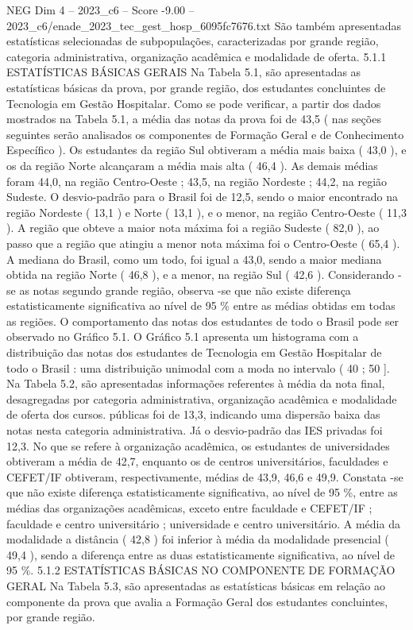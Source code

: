 \begin{textsample}{NEG Dim 4 – 2023\_c6 – Score -9.00 – 2023\_c6/enade\_2023\_tec\_gest\_hosp\_6095fc7676.txt}
São também apresentadas estatísticas selecionadas de subpopulações, caracterizadas por grande região, categoria administrativa, organização acadêmica e modalidade de oferta. 5.1.1 ESTATÍSTICAS BÁSICAS GERAIS Na Tabela 5.1, são apresentadas as estatísticas básicas da prova, por grande região, dos estudantes concluintes de Tecnologia em Gestão Hospitalar.
Como se pode verificar, a partir dos dados mostrados na Tabela 5.1, a média das notas da prova foi de 43,5 ( nas seções seguintes serão analisados os componentes de Formação Geral e de Conhecimento Específico ).
Os estudantes da região Sul obtiveram a média mais baixa ( 43,0 ), e os da região Norte alcançaram a média mais alta ( 46,4 ).
As demais médias foram 44,0, na região Centro-Oeste ; 43,5, na região Nordeste ; 44,2, na região Sudeste.
O desvio-padrão para o Brasil foi de 12,5, sendo o maior encontrado na região Nordeste ( 13,1 ) e Norte ( 13,1 ), e o menor, na região Centro-Oeste ( 11,3 ).
A região que obteve a maior nota máxima foi a região Sudeste ( 82,0 ), ao passo que a região que atingiu a menor nota máxima foi o Centro-Oeste ( 65,4 ).
A mediana do Brasil, como um todo, foi igual a 43,0, sendo a maior mediana obtida na região Norte ( 46,8 ), e a menor, na região Sul ( 42,6 ).
Considerando -se as notas segundo grande região, observa -se que não existe diferença estatisticamente significativa ao nível de 95 \% entre as médias obtidas em todas as regiões.
O comportamento das notas dos estudantes de todo o Brasil pode ser observado no Gráfico 5.1.
O Gráfico 5.1 apresenta um histograma com a distribuição das notas dos estudantes de Tecnologia em Gestão Hospitalar de todo o Brasil : uma distribuição unimodal com a moda no intervalo ( 40 ; 50 ].
Na Tabela 5.2, são apresentadas informações referentes à média da nota final, desagregadas por categoria administrativa, organização acadêmica e modalidade de oferta dos cursos. públicas foi de 13,3, indicando uma dispersão baixa das notas nesta categoria administrativa.
Já o desvio-padrão das IES privadas foi 12,3.
No que se refere à organização acadêmica, os estudantes de universidades obtiveram a média de 42,7, enquanto os de centros universitários, faculdades e CEFET/IF obtiveram, respectivamente, médias de 43,9, 46,6 e 49,9.
Constata -se que não existe diferença estatisticamente significativa, ao nível de 95 \%, entre as médias das organizações acadêmicas, exceto entre faculdade e CEFET/IF ; faculdade e centro universitário ; universidade e centro universitário.
A média da modalidade a distância ( 42,8 ) foi inferior à média da modalidade presencial ( 49,4 ), sendo a diferença entre as duas estatisticamente significativa, ao nível de 95 \%. 5.1.2 ESTATÍSTICAS BÁSICAS NO COMPONENTE DE FORMAÇÃO GERAL Na Tabela 5.3, são apresentadas as estatísticas básicas em relação ao componente da prova que avalia a Formação Geral dos estudantes concluintes, por grande região.

\end{textsample}
